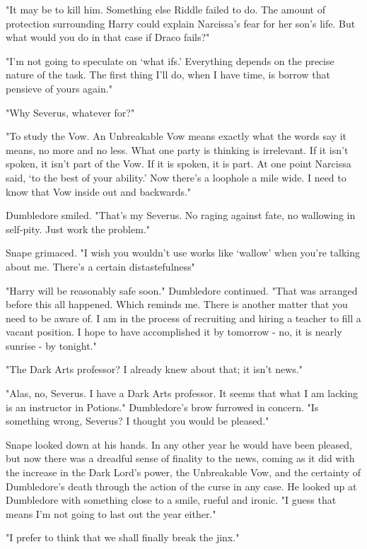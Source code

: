 "It may be to kill him. Something else Riddle failed to do. The amount of protection surrounding Harry could explain Narcissa's fear for her son's life. But what would you do in that case if Draco fails?"

"I'm not going to speculate on `what ifs.' Everything depends on the precise nature of the task. The first thing I'll do, when I have time, is borrow that pensieve of yours again."

"Why Severus, whatever for?"

"To study the Vow. An Unbreakable Vow means exactly what the words say it means, no more and no less. What one party is thinking is irrelevant. If it isn't spoken, it isn't part of the Vow. If it is spoken, it is part. At one point Narcissa said, `to the best of your ability.' Now there's a loophole a mile wide. I need to know that Vow inside out and backwards."

Dumbledore smiled. "That's my Severus. No raging against fate, no wallowing in self-pity. Just work the problem."

Snape grimaced. "I wish you wouldn't use works like `wallow' when you're talking about me. There's a certain distastefulness{\el}"

"Harry will be reasonably safe soon." Dumbledore continued. "That was arranged before this all happened. Which reminds me. There is another matter that you need to be aware of. I am in the process of recruiting and hiring a teacher to fill a vacant position. I hope to have accomplished it by tomorrow - no, it is nearly sunrise - by tonight."

"The Dark Arts professor? I already knew about that; it isn't news."

"Alas, no, Severus. I have a Dark Arts professor. It seems that what I am lacking is an instructor in Potions." Dumbledore's brow furrowed in concern. "Is something wrong, Severus? I thought you would be pleased."

Snape looked down at his hands. In any other year he would have been pleased, but now there was a dreadful sense of finality to the news, coming as it did with the increase in the Dark Lord's power, the Unbreakable Vow, and the certainty of Dumbledore's death through the action of the curse in any case. He looked up at Dumbledore with something close to a smile, rueful and ironic. "I guess that means I'm not going to last out the year either."

"I prefer to think that we shall finally break the jinx."

